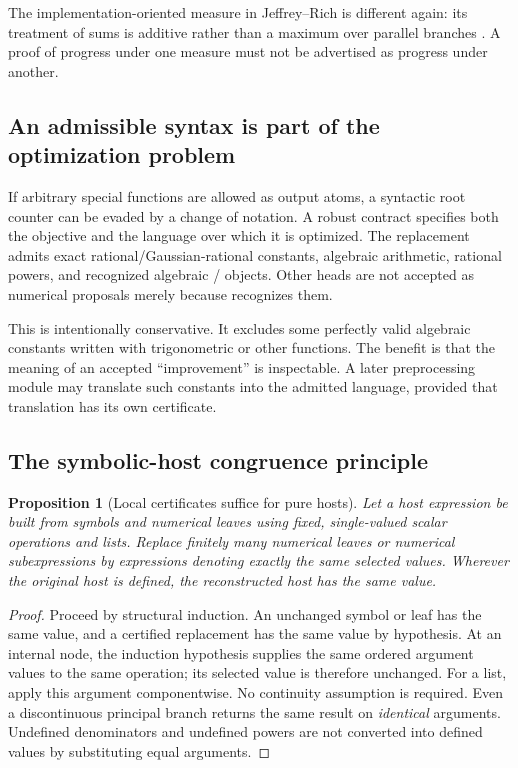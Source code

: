 \documentclass[11pt,letterpaper]{article}
\numberwithin{equation}{section}
\newtheorem{proposition}[theorem]{Proposition}
\theoremstyle{definition}\newtheorem{definition}[theorem]{Definition}
\theoremstyle{remark}\newtheorem{remark}[theorem]{Remark}
\newcommand{\code}[1]{\texttt{\detokenize{#1}}}
\begin{document}
The implementation-oriented measure in Jeffrey--Rich is different again: its treatment of sums is additive rather than a maximum over parallel branches \cite{jeffrey}. A proof of progress under one measure must not be advertised as progress under another.

\subsection{An admissible syntax is part of the optimization problem}
If arbitrary special functions are allowed as output atoms, a syntactic root counter can be evaded by a change of notation. A robust contract specifies both the objective and the language over which it is optimized. The replacement admits exact rational/Gaussian-rational constants, algebraic arithmetic, rational powers, and recognized algebraic \code{Root}/\code{AlgebraicNumber} objects. Other heads are not accepted as numerical proposals merely because \code{NumericQ} recognizes them.

This is intentionally conservative. It excludes some perfectly valid algebraic constants written with trigonometric or other functions. The benefit is that the meaning of an accepted ``improvement'' is inspectable. A later preprocessing module may translate such constants into the admitted language, provided that translation has its own certificate.

\subsection{The symbolic-host congruence principle}
\begin{proposition}[Local certificates suffice for pure hosts]\label{prop:congruence}
Let a host expression be built from symbols and numerical leaves using fixed, single-valued scalar operations and lists. Replace finitely many numerical leaves or numerical subexpressions by expressions denoting exactly the same selected values. Wherever the original host is defined, the reconstructed host has the same value.
\end{proposition}
\begin{proof}
Proceed by structural induction. An unchanged symbol or leaf has the same value, and a certified replacement has the same value by hypothesis. At an internal node, the induction hypothesis supplies the same ordered argument values to the same operation; its selected value is therefore unchanged. For a list, apply this argument componentwise. No continuity assumption is required. Even a discontinuous principal branch returns the same result on \emph{identical} arguments. Undefined denominators and undefined powers are not converted into defined values by substituting equal arguments.
\end{proof}
\end{document}
